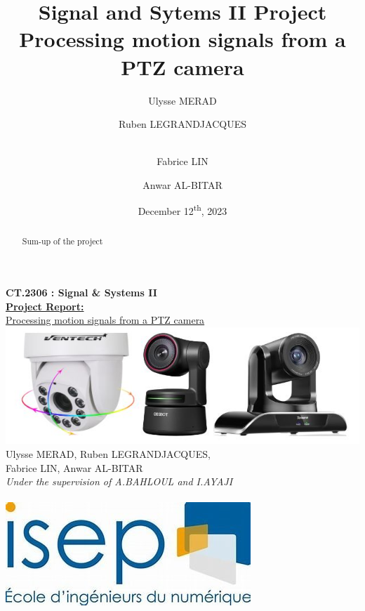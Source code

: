 \documentclass[a4paper,12pt]{article}
\title{Signal and Sytems II Project \\ [1ex]\large Processing motion signals from a PTZ camera  }
\author{Ulysse MERAD\and Ruben LEGRANDJACQUES \and \\Fabrice LIN \and Anwar AL-BITAR}
\date{December 12\textsuperscript{th}, 2023}
\begin{document}
\begin{titlepage}
  \centering
  \vspace{3cm}
  \Huge{\color{blue}\textbf{CT.2306 : Signal  \& Systems II }}\\
  \vspace{1cm}
  \Huge{\underline{\textbf{Project Report:}}}\\
  \vspace{0.5cm}
  \Large{ \underline{Processing motion signals from a PTZ camera}} \\
  \vspace{1cm}
  \includegraphics[scale=1]{camera.jpg}\\
  \vspace{0.5cm}
  Ulysse MERAD, Ruben LEGRANDJACQUES, \\ [0.5ex] Fabrice LIN, Anwar AL-BITAR \\
  \vspace{1.5cm}
  \large{\textit {Under the supervision of A.BAHLOUL and I.AYAJI}} \\
  \vspace{1.5cm}
  \thedate \\
  \vspace{2cm}
  \includegraphics[scale=0.7]{Isep.jpg}\\
  
\end{titlepage}

\begin{abstract}
  Sum-up of the project
\end{abstract}

\tableofcontents
\setlength{\parskip}{10pt}

\newpage
\end{document}
